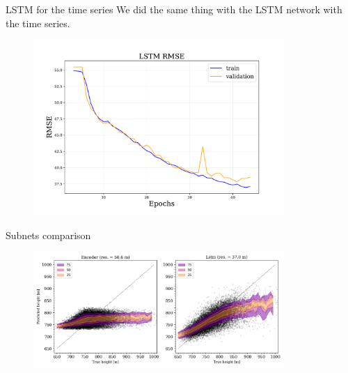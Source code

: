 \documentclass{beamer}
\begin{document}
\begin{frame}{LSTM for the time series}
    We did the same thing with the LSTM network with the time series.

    \begin{figure}
        \centering
        \includegraphics[width=0.85\textwidth]{figures/lstm_rmse.pdf}
    \end{figure}

\end{frame}

\begin{frame}{Subnets comparison}

    \begin{figure}
        \centering
        \includegraphics[width=0.85\textwidth]{figures/comparison_subnets_diagonal.png}
    \end{figure}
    
\end{frame}
\end{document}
